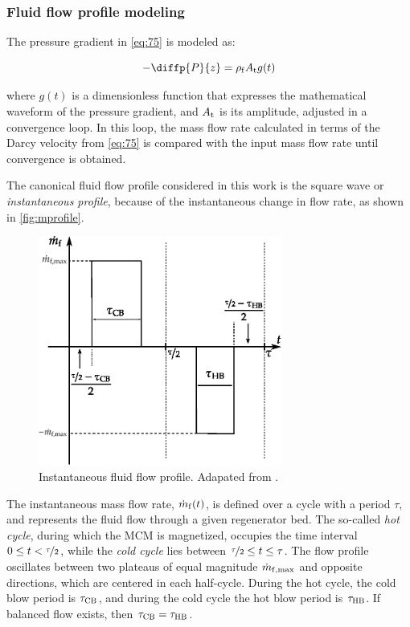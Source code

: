\documentclass[referee]{svjour3}
\begin{document}
\subsubsection{Fluid flow profile modeling}
\label{sec:how-fluid-flow}

The pressure gradient in \autoref{eq:75} is modeled as:

\begin{equation}
\label{eq:76}
-\diffp{P}{z} = \rho\ped{f} A\ped{t} g(t)
\end{equation}

\noindent where \(g(t)\) is a dimensionless function that expresses the mathematical waveform of the pressure gradient, and  \(A_{\mathrm{t}}\) is its amplitude,  adjusted in a convergence loop. In this loop, the mass flow rate calculated in terms of the Darcy velocity from \autoref{eq:75} is compared with the input   mass flow rate until convergence is obtained. 


The canonical fluid flow profile considered in this work is the square wave or \emph{instantaneous profile}, because of the instantaneous change in flow rate, as shown in \autoref{fig:mprofile}. 

\begin{figure}[!ht]
  \centering
  \includegraphics[width=8cm]{Fig2-mprofile}
  \caption{Instantaneous fluid flow profile. Adapated from \cite{bib:fortkamp20-desig}.}
  \label{fig:mprofile}
\end{figure}

The instantaneous mass flow rate, \(\dot{m}_{\mathrm{f}}(t)\), is defined over a cycle with a period \(\tau\), and represents the fluid flow through a given regenerator bed. The so-called \emph{hot cycle}, during which the MCM is magnetized, occupies the time interval \(0 \le t < \nicefrac{\tau}{2}\), while the \emph{cold cycle} lies between \(\nicefrac{\tau}{2} \le t \le \tau\). The flow profile oscillates between two plateaus of equal magnitude
\(\dot{m}_{\mathrm{f,max}}\) and opposite directions, which are centered in each half-cycle. During the hot cycle, the cold
blow period is \(\tau_{\mathrm{CB}}\), and during the cold cycle the hot blow period is \(\tau_{\mathrm{HB}}\). If balanced flow exists, then \(\tau_{\mathrm{CB}} = \tau_{\mathrm{HB}}\).
\end{document}
